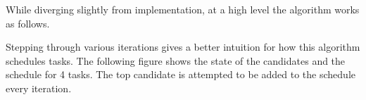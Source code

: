 \documentclass[conference]{IEEEtran}
\begin{document}
While diverging slightly from implementation, at a high level the algorithm works as follows.

\begin{algorithmic}[1]
	\ELSE
	\ENDIF
	\ENDWHILE
\end{algorithmic}

Stepping through various iterations gives a better intuition for how this algorithm schedules tasks.
The following figure shows the state of the candidates and the schedule for 4 tasks.
The top candidate is attempted to be added to the schedule every iteration.

\end{document}
